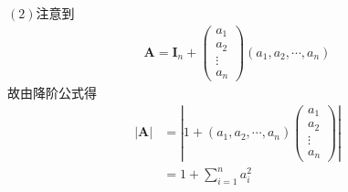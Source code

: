 \begin{solution}
$(2)$注意到\begin{align*}
	\bm{A}=\bm{I}_n+\begin{pmatrix}
		a_1\\a_2\\\vdots\\a_n
	\end{pmatrix}\left(a_1,a_2,\cdots,a_n\right)
\end{align*}
故由降阶公式得
\begin{align*}
	\left|\bm{A}\right|&=
	\left|1+\left(a_1,a_2,\cdots,a_n\right)\begin{pmatrix}
		a_1\\a_2\\\vdots\\a_n
	\end{pmatrix}\right|\\
	&=1+\sum_{i=1}^{n}a_i^2
\end{align*}
\end{solution}
